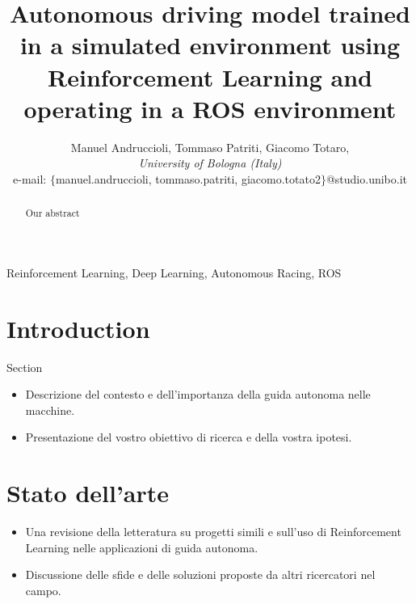 \documentclass[conference]{IEEEtran}
\begin{document}
\title{
    Autonomous driving model trained in a simulated environment using Reinforcement Learning and operating in a ROS environment
}

\author{Manuel Andruccioli,
Tommaso Patriti,
Giacomo Totaro,\\ 
\textit{University of Bologna (Italy)} \\
e-mail: $\{$manuel.andruccioli, tommaso.patriti, giacomo.totato2$\}$@studio.unibo.it }

\maketitle

\begin{abstract}
Our abstract
\end{abstract}

\begin{IEEEkeywords}
    Reinforcement Learning, Deep Learning, Autonomous Racing, ROS
\end{IEEEkeywords}

\section{Introduction}

Section \cite{test}

\begin{itemize}
    \item Descrizione del contesto e dell'importanza della guida autonoma nelle macchine.

    \item Presentazione del vostro obiettivo di ricerca e della vostra ipotesi.

\end{itemize}


\section{Stato dell'arte}

\begin{itemize}
    \item Una revisione della letteratura su progetti simili e sull'uso di Reinforcement Learning nelle applicazioni di guida autonoma.

    \item Discussione delle sfide e delle soluzioni proposte da altri ricercatori nel campo.

\end{itemize}
\end{document}

